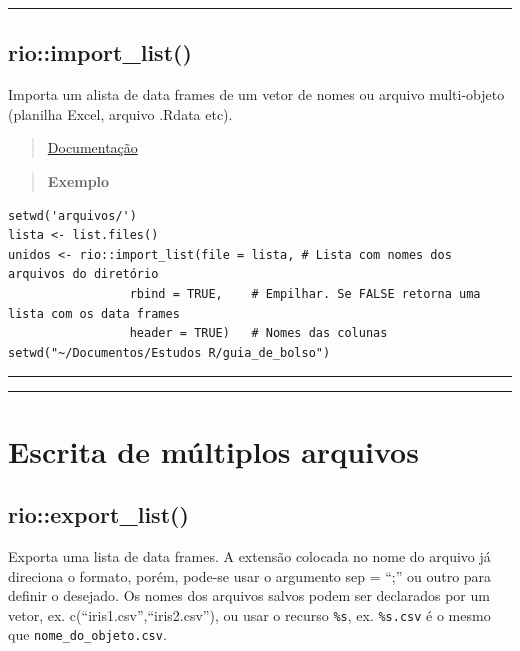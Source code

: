 \documentclass[
]{book}
\theoremstyle{definition}
\theoremstyle{definition}
\theoremstyle{definition}
\theoremstyle{definition}
\theoremstyle{remark}
\begin{document}
\begin{center}\rule{0.5\linewidth}{0.5pt}\end{center}

\hypertarget{rioimport_list}{%
\subsection{rio::import\_list()}\label{rioimport_list}}

Importa um alista de data frames de um vetor de nomes ou arquivo multi-objeto (planilha Excel, arquivo .Rdata etc).

\begin{quote}
\href{https://www.rdocumentation.org/packages/rio/versions/0.5.29/topics/import_list}{Documentação}
\end{quote}

\begin{quote}
\textbf{Exemplo}
\end{quote}

\begin{verbatim}
setwd('arquivos/')
lista <- list.files()
unidos <- rio::import_list(file = lista, # Lista com nomes dos arquivos do diretório
                 rbind = TRUE,    # Empilhar. Se FALSE retorna uma lista com os data frames
                 header = TRUE)   # Nomes das colunas
setwd("~/Documentos/Estudos R/guia_de_bolso")
\end{verbatim}

\begin{center}\rule{0.5\linewidth}{0.5pt}\end{center}

\begin{center}\rule{0.5\linewidth}{0.5pt}\end{center}

\hypertarget{escrita-de-muxfaltiplos-arquivos}{%
\section{Escrita de múltiplos arquivos}\label{escrita-de-muxfaltiplos-arquivos}}

\hypertarget{rioexport_list}{%
\subsection{rio::export\_list()}\label{rioexport_list}}

Exporta uma lista de data frames. A extensão colocada no nome do arquivo já direciona o formato, porém, pode-se usar o argumento sep = ``;'' ou outro para definir o desejado. Os nomes dos arquivos salvos podem ser declarados por um vetor, ex. c(``iris1.csv'',``iris2.csv''), ou usar o recurso \texttt{\%s}, ex. \texttt{\%s.csv} é o mesmo que \texttt{nome\_do\_objeto.csv}.
\end{document}
